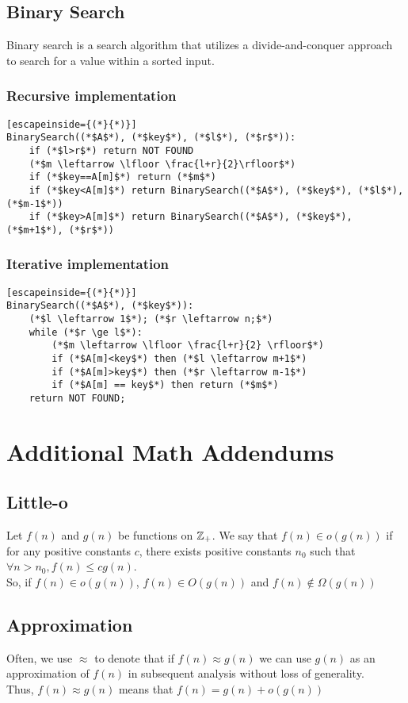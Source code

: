 \documentclass[a4paper]{article}
\begin{document}
\subsection{Binary Search}
Binary search is a search algorithm that utilizes a divide-and-conquer approach to search for a value within a sorted input.
\subsubsection{Recursive implementation}
\begin{lstlisting}[escapeinside={(*}{*)}]
BinarySearch((*$A$*), (*$key$*), (*$l$*), (*$r$*)):
	if (*$l>r$*) return NOT FOUND
	(*$m \leftarrow \lfloor \frac{l+r}{2}\rfloor$*)
	if (*$key==A[m]$*) return (*$m$*)
	if (*$key<A[m]$*) return BinarySearch((*$A$*), (*$key$*), (*$l$*), (*$m-1$*))
	if (*$key>A[m]$*) return BinarySearch((*$A$*), (*$key$*), (*$m+1$*), (*$r$*))
\end{lstlisting}

\subsubsection{Iterative implementation}
\begin{lstlisting}[escapeinside={(*}{*)}]
BinarySearch((*$A$*), (*$key$*)):
	(*$l \leftarrow 1$*); (*$r \leftarrow n;$*)
	while (*$r \ge l$*):
		(*$m \leftarrow \lfloor \frac{l+r}{2} \rfloor$*)
		if (*$A[m]<key$*) then (*$l \leftarrow m+1$*)
		if (*$A[m]>key$*) then (*$r \leftarrow m-1$*)
		if (*$A[m] == key$*) then return (*$m$*)
	return NOT FOUND;
\end{lstlisting}

\section{Additional Math Addendums}

\subsection{Little-o}
Let $f(n)$ and $g(n)$ be functions on $\mathbb{Z}_{+}$. We say that $f(n) \in o(g(n))$ if for any positive constants $c$, there exists positive constants $n_0$ such that $\forall n > n_0, f(n) \le cg(n)$.\\
So, if $f(n) \in o(g(n))$, $f(n) \in O(g(n))$ and $f(n) \notin \Omega(g(n))$

\subsection{Approximation}
Often, we use $\approx$ to denote that if $f(n) \approx g(n)$ we can use $g(n)$ as an approximation of $f(n)$ in subsequent analysis without loss of generality.\\
Thus, $f(n) \approx g(n)$ means that $f(n) = g(n) + o(g(n))$
\end{document}
